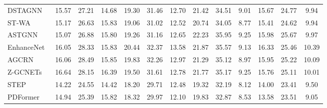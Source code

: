 \documentclass[letterpaper]{article} \usepackage{aaai24}  \usepackage{times}  \usepackage{helvet}  \usepackage{courier}  \usepackage[hyphens]{url}  \usepackage{graphicx} \urlstyle{rm} \def\UrlFont{\rm}  \usepackage{natbib}  \usepackage{caption} \frenchspacing  \setlength{\pdfpagewidth}{8.5in} \setlength{\pdfpageheight}{11in} \usepackage{algorithm}
\begin{document}
\begin{table*}[h]
{\begin{tabular}{l|c c c|c c c |c c c|c c c}
DSTAGNN~\cite{lan2022dstagnn}               & 15.57                & 27.21          & 14.68                      & 19.30                 & 31.46            & 12.70                     & 21.42                &  34.51               & 9.01                 & 15.67                &  24.77              & 9.94                  \\
ST-WA~\cite{cirstea2022towards}             & 15.17                & 26.63          & 15.83                      & 19.06                & 31.02            & 12.52                    & 20.74                &  34.05               & 8.77                 & 15.41                &  24.62              & 9.94                  \\
ASTGNN~\cite{guo2021learning}               & 15.07                & 26.88          & 15.80                       & 19.26                & 31.16            & 12.65                    & 22.23                &  35.95               & 9.25                 & 15.98                &  25.67              & 9.97                  \\
EnhanceNet~\cite{cirstea2021enhancenet}     & 16.05                & 28.33          & 15.83                      & 20.44                & 32.37            & 13.58                    & 21.87                &  35.57               & 9.13                 & 16.33                &  25.46              & 10.39                 \\
AGCRN~\cite{bai2020adaptive}                & 16.06                & 28.49          & 15.85                      & 19.83                & 32.26            & 12.97                    & 21.29                &  35.12               & 8.97                 & 15.95                &  25.22              & 10.09                 \\
Z-GCNETs~\cite{chen2021z}                   & 16.64                & 28.15          & 16.39                      & 19.50                 & 31.61            & 12.78                    & 21.77                &  35.17               & 9.25                 & 15.76                &  25.11              & 10.01                 \\
STEP~\cite{shao2022pre}                     & 14.22                & 24.55          & 14.42                      & 18.20                 & 29.71            & 12.48                    & 19.32                &  32.19               & 8.12                 & 14.00                &  23.41              & 9.50                  \\
PDFormer~\cite{jiang2023pdformer}           & 14.94                    & 25.39              & 15.82                          & 18.32                & 29.97            & 12.10               & 19.83                &  32.87               & 8.53                 & 13.58                &  23.51              & 9.05                  \\

\end{tabular}}
\end{table*}
\end{document}

